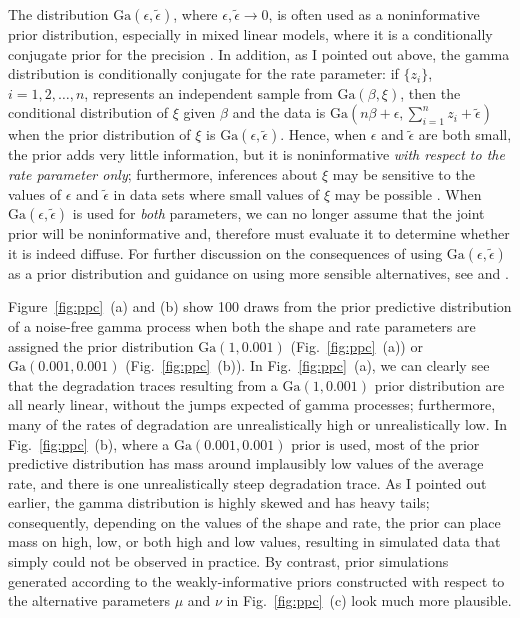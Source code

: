 The distribution $\mbox{Ga}(\epsilon, \tilde{\epsilon})$, where $\epsilon, \tilde{\epsilon}\longrightarrow 0$, is often used as a noninformative prior distribution, especially in mixed linear models, where it is a conditionally conjugate prior for the precision \citep[p.~33]{hodges_2014}. In addition, as I pointed out above, the gamma distribution is conditionally conjugate for the rate parameter: if $\{ z_i \}$, $i = 1, 2, \ldots, n$, represents an independent sample from $\mbox{Ga}(\beta, \xi)$, then the conditional distribution of $\xi$ given $\beta$ and the data is $\mbox{Ga}(n\beta + \epsilon, \sum_{i=1}^n z_i + \tilde{\epsilon})$ when the prior distribution of $\xi$ is $\mbox{Ga}(\epsilon, \tilde{\epsilon})$. Hence, when $\epsilon$ and $\tilde{\epsilon}$ are both small, the prior adds very little information, but it is noninformative \textit{with respect to the rate parameter only}; furthermore, inferences about $\xi$ may be sensitive to the values of $\epsilon$ and $\tilde{\epsilon}$ in data sets where small values of $\xi$ may be possible \citep[p.~130]{gelman_workflow_2020}. When $\mbox{Ga}(\epsilon, \tilde{\epsilon})$ is used for \textit{both} parameters, we can no longer assume that the joint prior will be noninformative and, therefore must evaluate it to determine whether it is indeed diffuse. For further discussion on the consequences of using $\mbox{Ga}(\epsilon, \tilde{\epsilon})$ as a prior distribution and guidance on using more sensible alternatives, see \cite{hodges_2014} and \cite{gelman_workflow_2020}.

Figure~\ref{fig:ppc}~(a) and (b) show 100 draws from the prior predictive distribution of a noise-free gamma process when both the shape and rate parameters are assigned the prior distribution $\mbox{Ga}(1, 0.001)$ (Fig.~\ref{fig:ppc}~(a)) or $\mbox{Ga}(0.001, 0.001)$ (Fig.~\ref{fig:ppc}~(b)). In Fig.~\ref{fig:ppc}~(a), we can clearly see that the degradation traces resulting from a $\mbox{Ga}(1, 0.001)$ prior distribution are all nearly linear, without the jumps expected of gamma processes; furthermore, many of the rates of degradation are unrealistically high or unrealistically low. In Fig.~\ref{fig:ppc}~(b), where a $\mbox{Ga}(0.001, 0.001)$ prior is used, most of the prior predictive distribution has mass around implausibly low values of the average rate, and there is one unrealistically steep degradation trace. As I pointed out earlier, the gamma distribution is highly skewed and has heavy tails; consequently, depending on the values of the shape and rate, the prior can place mass on high, low, or both high and low values, resulting in simulated data that simply could not be observed in practice. By contrast, prior simulations generated according to the weakly-informative priors constructed with respect to the alternative parameters $\mu$ and $\nu$ in Fig.~\ref{fig:ppc}~(c) look much more plausible.

